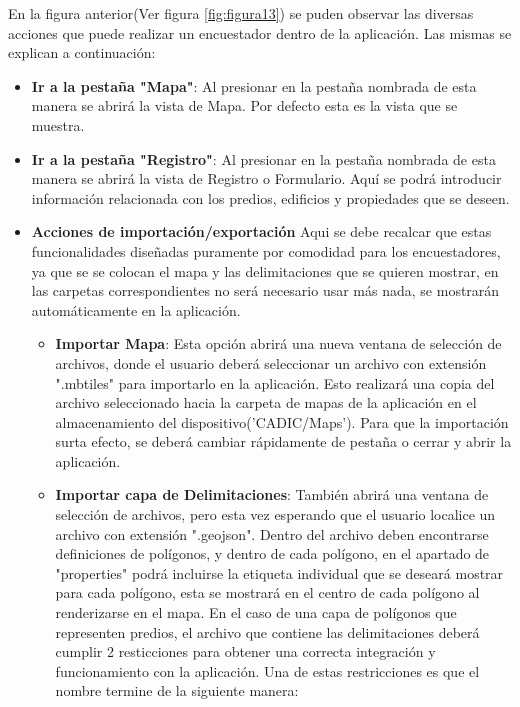 En la figura anterior(Ver figura \ref{fig:figura13}) se puden observar las diversas acciones que puede realizar un encuestador dentro de
la aplicación. Las mismas se explican a continuación:
\begin{itemize}
    \item \textbf{Ir a la pestaña "Mapa"}: Al presionar en la pestaña nombrada de esta manera se abrirá la vista de Mapa. Por defecto esta es la vista que se muestra.
    \item \textbf{Ir a la pestaña "Registro"}: Al presionar en la pestaña nombrada de esta manera se abrirá la vista de Registro o Formulario. Aquí se podrá introducir información relacionada con los predios, edificios y propiedades que se deseen.
    \item \textbf{Acciones de importación/exportación}
          Aqui se debe recalcar que estas funcionalidades diseñadas puramente por comodidad para los encuestadores, ya que se se colocan el mapa y las
          delimitaciones que se quieren mostrar, en las carpetas correspondientes no será necesario usar más nada, se mostrarán automáticamente en la aplicación.
          \begin{itemize}
              \item \textbf{Importar Mapa}: Esta opción abrirá una nueva ventana de selección de archivos, donde el usuario deberá seleccionar
                    un archivo con extensión ".mbtiles" para importarlo en la aplicación. Esto realizará una copia del archivo seleccionado hacia
                    la carpeta de mapas de la aplicación en el almacenamiento del dispositivo('CADIC/Maps'). Para que la importación surta efecto,
                    se deberá cambiar rápidamente de pestaña o cerrar y abrir la aplicación.
              \item \label{item:importaciongeojson}\textbf{Importar capa de Delimitaciones}: También abrirá una ventana de selección de archivos, pero esta vez esperando que
                    el usuario localice un archivo con extensión ".geojson". Dentro del archivo deben encontrarse definiciones de polígonos, y
                    dentro de cada polígono, en el apartado de "properties" podrá incluirse la etiqueta individual que se deseará mostrar para
                    cada polígono, esta se mostrará en el centro de cada polígono al renderizarse en el mapa. En el caso de una capa de polígonos
                    que representen predios, el archivo que contiene las delimitaciones deberá cumplir 2 resticciones para obtener
                    una correcta integración y funcionamiento con la aplicación. Una de estas restricciones es que el nombre termine de la siguiente manera:

\end{itemize}
\end{itemize}
